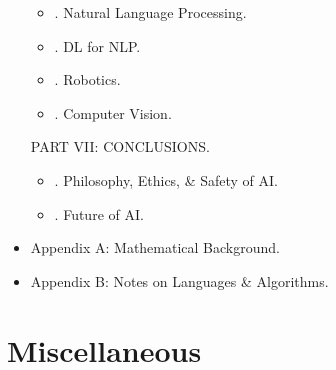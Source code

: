 \documentclass{article}
\begin{document}
\begin{itemize}
\begin{itemize}
		\item {. Natural Language Processing.}
		\item {. DL for NLP.}
		\item {. Robotics.}
		\item {. Computer Vision.}
	\end{itemize}
	PART VII: CONCLUSIONS.
	\begin{itemize}
		\item {. Philosophy, Ethics, \& Safety of AI.}
		\item {. Future of AI.}
	\end{itemize}
	\item {\sf Appendix A: Mathematical Background.}
	\item {\sf Appendix B: Notes on Languages \& Algorithms.}
\end{itemize}



\section{Miscellaneous}


\printbibliography[heading=bibintoc]
	
\end{document}
